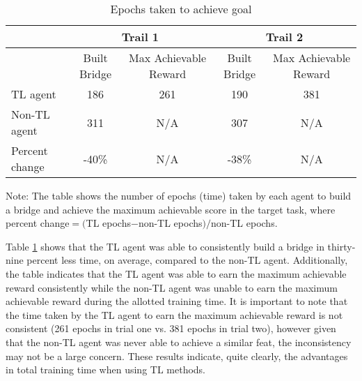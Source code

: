 \documentclass{llncs}
\begin{document}
\renewcommand{\arraystretch}{1.2}
\begin{table}[htb]
  \begin{threeparttable}
    \caption{Epochs taken to achieve goal}\label{tab:1}
    \begin{tabular}{l|c|c|c|c} 
      \hline
      & \multicolumn{2}{|c|}{Trail 1} & \multicolumn{2}{|c}{Trail 2} \\
      \hline
                     & Built Bridge & \multicolumn{1}{p{2.5cm}|}{\centering Max Achievable Reward} & Built Bridge & \multicolumn{1}{p{2.5cm}}{\centering Max Achievable Reward} \\
      \hline
      TL agent       & 186          & 261                      & 190          & 381                      \\
      Non-TL agent   & 311          & N/A                      & 307          & N/A                      \\
      Percent change & -40\%        & N/A                      & -38\%        & N/A                      \\ 
      \hline
    \end{tabular}
    \begin{tablenotes}[flushleft]\footnotesize
    \item{Note: The table shows the number of epochs (time) taken by each agent to build a bridge and achieve the maximum achievable score in the target task, where percent change$=($TL epochs$-$non-TL epochs$)/$non-TL epochs.}
    \end{tablenotes}
  \end{threeparttable}
\end{table}

Table \ref{tab:1} shows that the TL agent was able to consistently build a bridge in thirty-nine percent less time, on average, compared to the non-TL agent. 
Additionally, the table indicates that the TL agent was able to earn the maximum achievable reward consistently while the non-TL agent was unable to earn the maximum achievable reward during the allotted training time. 
It is important to note that the time taken by the TL agent to earn the maximum achievable reward is not consistent (261 epochs in trial one vs. 381 epochs in trial two), however given that the non-TL agent was never able to achieve a similar feat, the inconsistency may not be a large concern. 
These results indicate, quite clearly, the advantages in total training time when using TL methods. 
\end{document}
